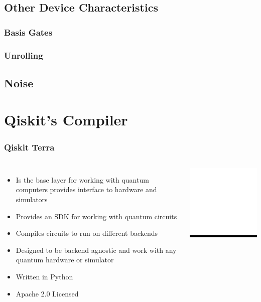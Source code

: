 \documentclass[aspectratio=169,11pt,hyperref={colorlinks=true}]{beamer}
\begin{document}
\subsection{Other Device Characteristics}
\begin{frame}
    \frametitle{Basis Gates}

\end{frame}
\begin{frame}
    \frametitle{Unrolling}

\end{frame}
\subsection{Noise}
\begin{frame}

\end{frame}

\section{Qiskit's Compiler}
\begin{frame}
    \frametitle{Qiskit Terra\footnotemark[1]}
    \begin{columns}
             \begin{itemize}
                  \item Is the base layer for working with quantum computers provides interface to hardware and simulators
                  \item Provides an SDK for working with quantum circuits
                  \item Compiles circuits to run on different backends
                  \item Designed to be backend agnostic and work with any
                      quantum hardware or simulator
                  \item Written in Python
                  \item Apache 2.0 Licensed
             \end{itemize}
              \centering
              \colorbox{black}{\includegraphics[width=.5\textwidth]{qiskit-terra-logo.png}}
      \end{columns}
  \end{frame}
\end{document}
